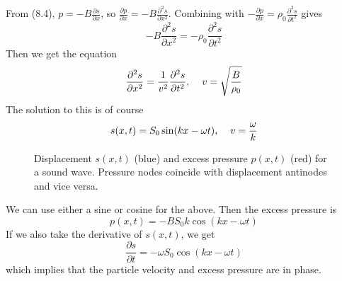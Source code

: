 \documentclass{report}
\numberwithin{equation}{section}
\newcommand{\pd}[2]{\frac{\partial #1}{\partial #2}}
\newcommand{\pdd}[2]{\frac{\partial^2 #1}{\partial #2^2}}
\begin{document}
From (8.4), $p = -B\pd{s}{x}$, so $\pd{p}{x} = -B\pdd{s}{x}$. Combining with $-\pd{p}{x} = \rho_0\pdd{s}{t}$ gives
\begin{equation*}
	-B\pdd{s}{x} = -\rho_0\pdd{s}{t}
\end{equation*}
Then we get the equation
\begin{equation}
	\pdd{s}{x} = \frac{1}{v^2} \pdd{s}{t},\hspace{0.4cm}v =\sqrt{\frac{B}{\rho_0}}
\end{equation}
The solution to this is of course
\begin{equation}
	s(x,t) = S_0\sin(kx-\omega t),\hspace{0.4cm} v=\frac{\omega}{k}
\end{equation}
\begin{figure}[H]
\centering
{}
\caption{Displacement $s(x,t)$ (blue) and excess pressure $p(x,t)$ (red) for a
sound wave. Pressure nodes coincide with displacement antinodes and vice versa.}
\end{figure}
We can use either a sine or cosine for the above. Then the excess pressure is
\begin{equation}
	p(x,t) = -BS_0k\cos(kx-\omega t)
\end{equation}
If we also take the derivative of $s(x,t)$, we get
\begin{equation}
	\pd{s}{t} = -\omega S_0 \cos(kx-\omega t)
\end{equation}
which implies that the particle velocity and excess pressure are in phase.
\end{document}
